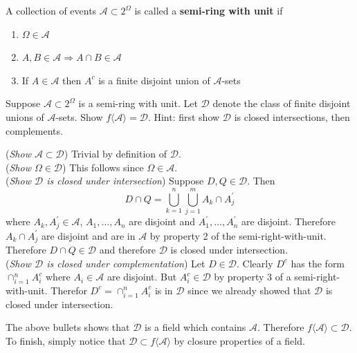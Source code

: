 \begin{definition}
A  collection of events $\mathcal A\subset 2^\Omega$ is called a {\bf semi-ring with unit} if
\begin{enumerate}
\item $\Omega\in \mathcal A$
\item $A, B\in\mathcal A\Longrightarrow A\cap B\in \mathcal A$
\item  If $A\in \mathcal A $ then $A^c$ is a finite disjoint union of $\mathcal A$-sets
\end{enumerate}
\end{definition}


\begin{exercise}
\label{ex: semi-ring}
Suppose $\mathcal A\subset 2^\Omega$ is a semi-ring with unit. Let $\mathscr D$ denote the class of finite disjoint unions of $\mathcal A$-sets. Show  $f\langle \mathcal A\rangle=\mathscr D$.
Hint: first show $\mathscr D$ is closed  intersections, then complements.
\end{exercise}
\begin{exerciseproof}

\textbullet({\sl Show $\mathcal A\subset \mathscr D$})
Trivial by definition of $\mathscr D$.
\\
\textbullet({\sl Show $\Omega\in \mathscr D$}) This follows since  $\Omega\in \mathcal A$.
\\
\textbullet({\sl Show $\mathscr D$ is closed under intersection})
Suppose $D, Q\in \mathscr D$. Then
\[
D\cap Q = \bigcup_{k=1}^n \bigcup_{j=1}^m A_k \cap  A_j^\prime
\]
where $A_k, A_j^\prime \in\mathcal A$, $A_1,\ldots, A_n$ are disjoint and $A_1^\prime,\ldots, A_n^\prime$  are disjoint. Therefore $A_k \cap  A_j^\prime$ are disjoint and are in $\mathcal A$ by property 2 of the semi-right-with-unit. Therefore $D\cap Q\in\mathscr D$ and therefore $\mathscr D$ is closed under intersection.
\\
\textbullet({\sl Show $\mathscr D$ is closed under complementation})
Let $D\in \mathscr D$. Clearly $D^c$ has the form $\cap_{i=1}^n A_i^c$ where $A_i\in \mathcal A$ are disjoint. But $A_i^c\in \mathscr D$ by property 3 of a semi-right-with-unit. Therefor $D^c= \cap_{i=1}^n A_i^c$ is in $\mathscr D$ since we already showed that $\mathscr D$ is closed under intersection.

The above bullets shows that $\mathscr D$ is a field which contains $\mathcal A$. Therefore $f\langle \mathcal A\rangle \subset \mathscr D$. To finish, simply notice that $\mathscr D\subset f\langle \mathcal A\rangle  $ by closure properties of a field.

\end{exerciseproof}




